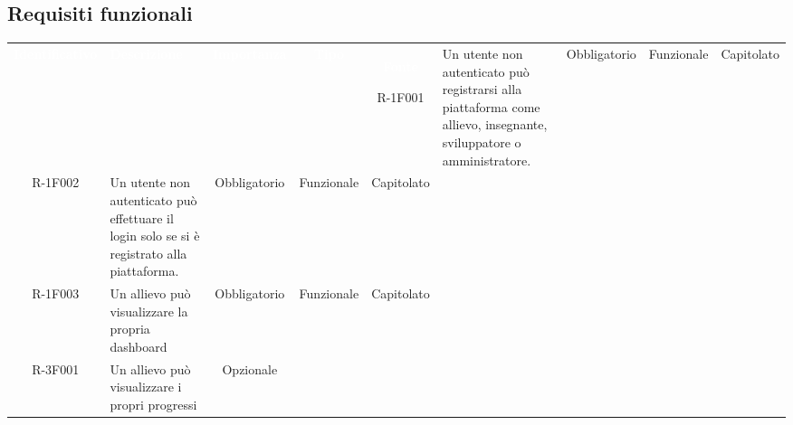 \subsection{Requisiti funzionali} 
\renewcommand{\arraystretch}{1.5}
\def\tabularxcolumn#1{m{#1}}
\begin{tabularx}{\textwidth}{cXccc}
 
   \textcolor{white}{\textbf{Identificativo}} &
   \textcolor{white}{\textbf{Descrizione}}&
   \textcolor{white}{\textbf{Importanza}}&
   \textcolor{white}{\textbf{Tipo}}&
   \textcolor{white}{\textbf{Fonte}}\endhead
 
R-1F001 &
 
Un utente non autenticato può registrarsi alla piattaforma come allievo, insegnante, sviluppatore o amministratore. &
 
Obbligatorio &
 
Funzionale &
 
Capitolato \\

R-1F002 &

Un utente non autenticato può effettuare il login solo se si è registrato alla piattaforma. &

Obbligatorio &

Funzionale &

Capitolato \\
R-1F003 &

Un allievo può visualizzare la propria dashboard &

Obbligatorio &

Funzionale &

Capitolato \\
R-3F001 &


Un allievo può visualizzare i propri progressi &

Opzionale &


\end{tabularx}
